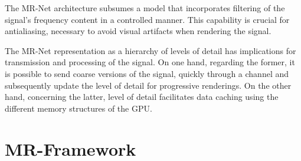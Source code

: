 The MR-Net architecture subsumes a model that incorporates filtering of the signal's frequency content in a controlled manner. This capability is crucial for antialiasing, necessary to avoid visual artifacts when rendering the signal.

The MR-Net representation as a hierarchy of levels of detail has implications for transmission and processing of the signal. On one hand, regarding the former, it is possible to send coarse versions of the signal, quickly through a channel and subsequently update the level of detail for progressive renderings. On the other hand, concerning the latter, level of detail facilitates data caching using the different memory structures of the GPU.

\section{MR-Framework}



